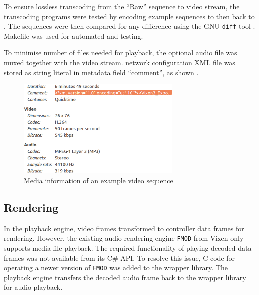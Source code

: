 To ensure lossless transcoding from the ``Raw'' sequence to  video stream, the transcoding programs were tested by encoding example sequences to  then  back to . The  sequences were then compared for any difference  using the GNU \texttt{diff} tool \cite{diff}.  Makefile was used for automated  and testing.

To minimise  number of files needed for playback, the optional audio file was muxed together with the video stream.  network configuration XML file was  stored  as  string literal in  metadata field  ``comment'', as shown  .

\begin{figure}[t]
  \centering
  \includegraphics[width=0.7\textwidth]{Figs/video_info.png}
  \caption{\footnotesize Media information of an example video sequence}
  \label{fig:video-info}
\end{figure}

\subsection{Rendering}

In the playback engine, video frames  transformed to controller data frames for rendering. However, the existing audio rendering engine \texttt{FMOD} from Vixen only supports media file playback. The required functionality of playing decoded  data frames was not available from its C\# API. To resolve this issue, C code for operating a newer version of \texttt{FMOD} was added to the wrapper library. The playback engine transfers the decoded audio frame back to the wrapper library for audio playback.


